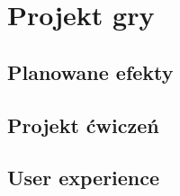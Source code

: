 \chapter{Projekt gry}
\thispagestyle{firststyle}

\section{Planowane efekty}

\section{Projekt ćwiczeń}

\section{User experience}